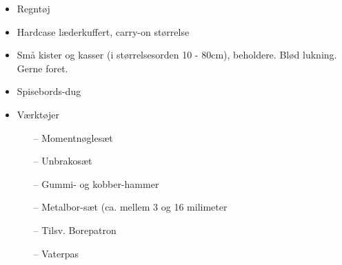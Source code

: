 
\begin{itemize}
\subsection{Praktiske Ting}
    \item Regntøj
    \item Hardcase læderkuffert, carry-on størrelse
    \item Små kister og kasser (i størrelsesorden 10 - 80cm), beholdere. Blød lukning. Gerne foret.
    \item Spisebords-dug
    \item Værktøjer
         \begin{itemize}
            \item[--]   Momentnøglesæt
            \item[--]   Unbrakosæt
            \item[--]   Gummi- og kobber-hammer
            \item[--]   Metalbor-sæt (ca. mellem 3 og 16 milimeter
            \item[--]   Tilsv. Borepatron
            \item[--]   Vaterpas
        \end{itemize}
\end{itemize}